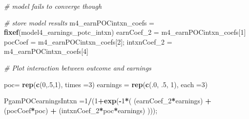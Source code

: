 \documentclass[]{article}
\newenvironment{Shaded}{\begin{snugshade}}{\end{snugshade}}
\newcommand{\CommentTok}[1]{\textcolor[rgb]{0.56,0.35,0.01}{\textit{#1}}}
\newcommand{\DataTypeTok}[1]{\textcolor[rgb]{0.13,0.29,0.53}{#1}}
\newcommand{\DecValTok}[1]{\textcolor[rgb]{0.00,0.00,0.81}{#1}}
\newcommand{\FloatTok}[1]{\textcolor[rgb]{0.00,0.00,0.81}{#1}}
\newcommand{\KeywordTok}[1]{\textcolor[rgb]{0.13,0.29,0.53}{\textbf{#1}}}
\newcommand{\NormalTok}[1]{#1}
\newcommand{\OperatorTok}[1]{\textcolor[rgb]{0.81,0.36,0.00}{\textbf{#1}}}
\newcommand{\StringTok}[1]{\textcolor[rgb]{0.31,0.60,0.02}{#1}}
\begin{document}
\begin{Shaded}
\begin{Highlighting}[]
\CommentTok{# model fails to converge though}

\CommentTok{# store model results}
\NormalTok{m4_earnPOCintxn_coefs =}\StringTok{ }\KeywordTok{fixef}\NormalTok{(model4_earnings_potc_intxn)}
\NormalTok{earnCoef_}\DecValTok{2}\NormalTok{ =}\StringTok{ }\NormalTok{m4_earnPOCintxn_coefs[}\DecValTok{1}\NormalTok{] }
\NormalTok{pocCoef =}\StringTok{ }\NormalTok{m4_earnPOCintxn_coefs[}\DecValTok{2}\NormalTok{];}
\NormalTok{intxnCoef_}\DecValTok{2}\NormalTok{ =}\StringTok{ }\NormalTok{m4_earnPOCintxn_coefs[}\DecValTok{4}\NormalTok{]}

\CommentTok{# Plot interaction between outcome and earnings}

\NormalTok{poc=}\StringTok{ }\KeywordTok{rep}\NormalTok{(}\KeywordTok{c}\NormalTok{(}\DecValTok{0}\NormalTok{,.}\DecValTok{5}\NormalTok{,}\DecValTok{1}\NormalTok{), }\DataTypeTok{times =}\DecValTok{3}\NormalTok{)}
\NormalTok{earnings =}\StringTok{ }\KeywordTok{rep}\NormalTok{(}\KeywordTok{c}\NormalTok{(.}\DecValTok{0}\NormalTok{, }\FloatTok{.5}\NormalTok{, }\DecValTok{1}\NormalTok{), }\DataTypeTok{each =}\DecValTok{3}\NormalTok{)}


\NormalTok{PgamPOCearningsIntxn =}\DecValTok{1}\OperatorTok{/}\NormalTok{(}\DecValTok{1}\OperatorTok{+}\KeywordTok{exp}\NormalTok{(}\OperatorTok{-}\DecValTok{1}\OperatorTok{*}\NormalTok{( (earnCoef_}\DecValTok{2}\OperatorTok{*}\NormalTok{earnings) }\OperatorTok{+}\StringTok{ }\NormalTok{(pocCoef}\OperatorTok{*}\NormalTok{poc) }\OperatorTok{+}\StringTok{ }\NormalTok{(intxnCoef_}\DecValTok{2}\OperatorTok{*}\NormalTok{poc}\OperatorTok{*}\NormalTok{earnings) )));}


\end{Highlighting}
\end{Shaded}
\end{document}
